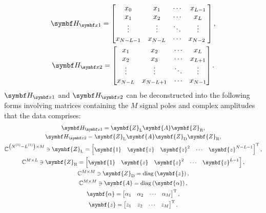 \begin{subequations}
   \begin{gather}
        \Hxone =
        \begin{bmatrix}
            x_0 & x_1 & \cdots & x_{L-1} \\
            x_{1} & x_{2} & \cdots & x_{L} \\
            \vdots & \vdots & \ddots & \vdots\\
            x_{N-L-1} & x_{N-L} & \cdots & x_{N-2}\
        \end{bmatrix}, \\
        \Hxtwo =
        \begin{bmatrix}
            x_{1} & x_{2} & \cdots & x_{L} \\
            x_{2} & x_{3} & \cdots & x_{L+1} \\
            \vdots & \vdots & \ddots & \vdots\\
            x_{N-L} & x_{N-L+1} & \cdots & x_{N-1}\\
        \end{bmatrix}.
   \end{gather}
\end{subequations}
$\Hxone$ and  $\Hxtwo$ can be deconstructed into the following forms involving
matrices containing the $M$ signal poles and complex amplitudes that the data
comprises:
\begin{subequations}
   \begin{gather}
       \Hxone = \symbf{Z}_{\text{L}} \symbf{A} \symbf{Z}_{\text{R}},\\
       \Hxtwo = \symbf{Z}_{\text{L}} \symbf{A} \symbf{Z}_{\text{D}} \symbf{Z}_{\text{R}},\\
       \mathbb{C}^{\left(\None - \Lone\right) \times M} \ni
       \symbf{Z}_{\text{L}} =
       \begin{bmatrix}
           \symbf{1} &
           \symbf{z} &
           \symbf{z}^2 &
           \cdots &
           \symbf{z}^{N-L-1}
        \end{bmatrix}\T,\\
        \mathbb{C}^{M \times L} \ni
        \symbf{Z}_{\text{R}} =
           \begin{bmatrix}
               \symbf{1} & \symbf{z} & {\symbf{z}}^{2} & \cdots & {\symbf{z}}^{L-1}
           \end{bmatrix} ,\\
        \mathbb{C}^{M \times M} \ni
        \symbf{Z}_{\text{D}} = \diag\left(\symbf{z}\right), \label{eq:ZD}\\
        \mathbb{C}^{M \times M} \ni
        \symbf{A} = \diag\left(\symbf{\alpha}\right),\label{eq:A}\\
        \symbf{\alpha} =
        \begin{bmatrix}
            \alpha_1 & \alpha_2 & \cdots & \alpha_M
        \end{bmatrix}\T,\\
        \symbf{z} =
        \begin{bmatrix}
            z_1 & z_2 & \cdots & z_M
        \end{bmatrix}\T.
   \end{gather}%
    \label{eq:HX-decomp}%
\end{subequations}%
